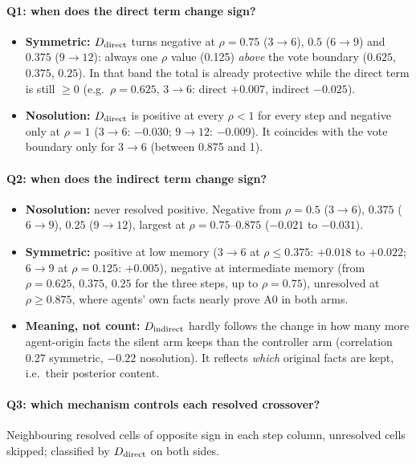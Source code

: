\documentclass[10pt,a4paper]{article}
\begin{document}
\paragraph{Q1: when does the direct term change sign?}
\begin{itemize}\itemsep1pt
\item \textbf{Symmetric:} $D_{\rm direct}$ turns negative at $\rho = 0.75$ ($3\!\to\!6$), $0.5$ ($6\!\to\!9$) and
  $0.375$ ($9\!\to\!12$): always one $\rho$ value (0.125) \emph{above} the vote boundary ($0.625$, $0.375$, $0.25$). In
  that band the total is already protective while the direct term is still $\ge 0$ (e.g.\ $\rho = 0.625$,
  $3\!\to\!6$: direct $+0.007$, indirect $-0.025$).
\item \textbf{Nosolution:} $D_{\rm direct}$ is positive at every $\rho < 1$ for every step and negative only at
  $\rho = 1$ ($3\!\to\!6$: $-0.030$; $9\!\to\!12$: $-0.009$). It coincides with the vote boundary only for $3\!\to\!6$
  (between 0.875 and 1).
\end{itemize}

\paragraph{Q2: when does the indirect term change sign?}
\begin{itemize}\itemsep1pt
\item \textbf{Nosolution:} never resolved positive. Negative from $\rho = 0.5$ ($3\!\to\!6$), $0.375$ ($6\!\to\!9$),
  $0.25$ ($9\!\to\!12$), largest at $\rho = 0.75$--$0.875$ ($-0.021$ to $-0.031$).
\item \textbf{Symmetric:} positive at low memory ($3\!\to\!6$ at $\rho \le 0.375$: $+0.018$ to $+0.022$; $6\!\to\!9$ at
  $\rho = 0.125$: $+0.005$), negative at intermediate memory (from $\rho = 0.625$, $0.375$, $0.25$ for the three steps, up
  to $\rho = 0.75$), unresolved at $\rho \ge 0.875$, where agents' own facts nearly prove A0 in both arms.
\item \textbf{Meaning, not count:} $D_{\rm indirect}$ hardly follows the change in how many more agent-origin facts the
  silent arm keeps than the controller arm (correlation 0.27 symmetric, $-0.22$ nosolution). It reflects \emph{which}
  original facts are kept, i.e.\ their posterior content.
\end{itemize}

\paragraph{Q3: which mechanism controls each resolved crossover?} Neighbouring resolved cells of opposite sign in each
step column, unresolved cells skipped; classified by $D_{\rm direct}$ on both sides.
\end{document}
